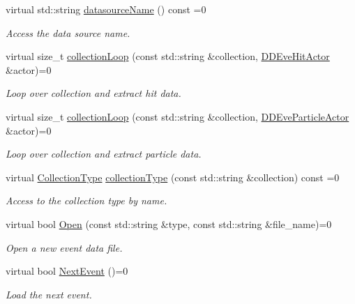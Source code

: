 \begin{DoxyCompactItemize}
virtual std\+::string \hyperlink{class_d_d4hep_1_1_event_handler_a5fa231363a787ba7edf520b5a99f294e}{datasource\+Name} () const =0
\begin{DoxyCompactList}\small\item\em Access the data source name. \end{DoxyCompactList}\item 
virtual size\+\_\+t \hyperlink{class_d_d4hep_1_1_event_handler_a454baeb81b675f3ebd8bb4293064b787}{collection\+Loop} (const std\+::string \&collection, \hyperlink{struct_d_d4hep_1_1_d_d_eve_hit_actor}{D\+D\+Eve\+Hit\+Actor} \&actor)=0
\begin{DoxyCompactList}\small\item\em Loop over collection and extract hit data. \end{DoxyCompactList}\item 
virtual size\+\_\+t \hyperlink{class_d_d4hep_1_1_event_handler_ae43595c2760736a7ca628183a2c91ec2}{collection\+Loop} (const std\+::string \&collection, \hyperlink{struct_d_d4hep_1_1_d_d_eve_particle_actor}{D\+D\+Eve\+Particle\+Actor} \&actor)=0
\begin{DoxyCompactList}\small\item\em Loop over collection and extract particle data. \end{DoxyCompactList}\item 
virtual \hyperlink{class_d_d4hep_1_1_event_handler_a0b22a141a019364495835317fad48254}{Collection\+Type} \hyperlink{class_d_d4hep_1_1_event_handler_a8424ffc2056b0e23d69c81ab2496cd51}{collection\+Type} (const std\+::string \&collection) const =0
\begin{DoxyCompactList}\small\item\em Access to the collection type by name. \end{DoxyCompactList}\item 
virtual bool \hyperlink{class_d_d4hep_1_1_event_handler_a90995d3b610beee9d9f7fafcc060626b}{Open} (const std\+::string \&type, const std\+::string \&file\+\_\+name)=0
\begin{DoxyCompactList}\small\item\em Open a new event data file. \end{DoxyCompactList}\item 
virtual bool \hyperlink{class_d_d4hep_1_1_event_handler_ac2360791d3a44f4cef0987f9a7ec51ce}{Next\+Event} ()=0
\begin{DoxyCompactList}\small\item\em Load the next event. \end{DoxyCompactList}\item 

\end{DoxyCompactItemize}
